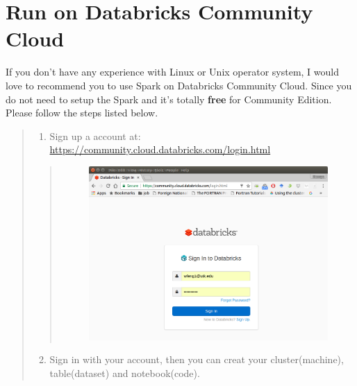 \documentclass[letterpaper,11pt,english]{sphinxmanual}
\begin{document}

\section{Run on Databricks Community Cloud}
\label{setup:run-on-databricks-community-cloud}\label{setup:index-0}
If you don't have any experience with Linux or Unix operator
system, I would love to recommend you to use Spark on Databricks
Community Cloud. Since you do not need to setup the Spark and it's
totally \textbf{free} for Community Edition. Please follow the steps
listed below.
\begin{quote}
\begin{enumerate}
\item {} 
Sign up a account at: \href{https://community.cloud.databricks.com/login.html}{https://community.cloud.databricks.com/login.html}

\end{enumerate}
\begin{quote}
\begin{figure}[htbp]
\centering

\includegraphics{login.png}
\label{setup:fig-login}\end{figure}
\end{quote}
\begin{enumerate}
\setcounter{enumi}{1}
\item {} 
Sign in with your account, then you can creat your cluster(machine), table(dataset)
and notebook(code).

\end{enumerate}
\begin{quote}
\begin{figure}[htbp]
\centering


\end{figure}
\end{quote}
\end{quote}
\end{document}
